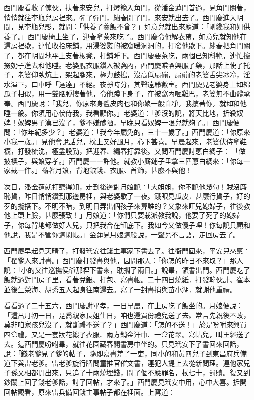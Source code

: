 西門慶看收了傢伙，扶著來安兒，打燈籠入角門，從潘金蓮門首過，見角門關著，悄悄就往李瓶兒房裡來。彈了彈門，繡春開了門，來安就出去了。西門慶進入明間，見李瓶兒影，就問：「供養了羹飯不曾？」如意兒就出來應道：「剛纔我和姐供養了。」西門慶椅上坐了，迎春拿茶來吃了。西門慶令他解衣帶，如意兒就知他在這房裡歇，連忙收拾床鋪，用湯婆熨的被窩暖洞洞的，打發他歇下。繡春把角門關了，都在明間地平上支著板凳，打鋪睡下。西門慶要茶吃，兩個已知科範，連忙攛掇奶子進去和他睡。老婆脫衣服鑽入被窩內，西門慶乘酒興服了藥，那話上使了托子，老婆仰臥炕上，架起腿來，極力鼓搗，沒高低扇磞，扇磞的老婆舌尖冰冷，淫水溢下，口中呼「達達」不絕。夜靜時分，其聲遠聆數室。西門慶見老婆身上如綿瓜子相似，用一雙胳膊摟著他，令他蹲下身子，在被窩內咂雞巴，老婆無不曲體承奉。西門慶說：「我兒，你原來身體皮肉也和你娘一般白凈，我摟著你，就如和他睡一般。你須用心伏侍我，我看顧你。」老婆道：「爹沒的說，將天比地，折殺奴婢！奴婢男子漢已沒了，爹不嫌醜陋，早晚只看奴婢一眼兒就夠了。」西門慶便問：「你年紀多少？」老婆道：「我今年屬免的，三十一歲了。」西門慶道：「你原來小我一歲。」見他會說話兒，枕上又好風月，心下甚喜。早晨起來，老婆伏侍拿鞋襪，打發梳洗，極盡殷勤，把迎春、繡春打靠後。又問西門慶討蔥白綢子： 「做披襖子，與娘穿孝。」西門慶一一許他。就教小廝鋪子里拿三匹蔥白綢來：「你每一家裁一件。」瞞著月娘，背地銀錢、衣服、首飾，甚麼不與他！

次日，潘金蓮就打聽得知，走到後邊對月娘說：「大姐姐，你不說他幾句！賊沒廉恥貨，昨日悄悄鑽到那邊房裡，與老婆歇了一夜。餓眼見瓜皮，甚麼行貨子，好的歹的攬搭下。不明不暗，到明日弄出個孩子來算誰的？又象來旺兒媳婦子，往後教他上頭上臉，甚麼張致！」月娘道：「你們只要栽派教我說，他要了死了的媳婦子，你每背地都做好人兒，只把我合在缸底下。我如今又做傻子哩！你每說只顧和他說，我是不管你這閑帳。」金蓮見月娘這般說，一聲兒不言語，走回房去了。

西門慶早起見天晴了，打發玳安往錢主事家下書去了。往衙門回來，平安兒來稟：「翟爹人來討書。」西門慶打發書與他，因問那人：「你怎的昨日不來取？」那人說：「小的又往巡撫侯爺那裡下書來，耽擱了兩日。」說畢，領書出門。西門慶吃了飯就過對門房子里，看著兌銀、打包、寫書帳。二十四日燒紙，打發韓伙計、崔本並後生榮海、胡秀五人起身往南邊去。寫了一封書捎與苗小湖，就謝他重禮。

看看過了二十五六，西門慶謝畢孝，一日早晨，在上房吃了飯坐的。月娘便說：「這出月初一日，是喬親家長姐生日，咱也還買份禮兒送了去。常言先親後不改，莫非咱家孩兒沒了，就斷禮不送了？」西門慶道：「怎的不送！」於是吩咐來興買四盒禮，又是一套妝花緞子衣服、兩方銷金汗巾、一盒花翠。寫帖兒，叫王經送了去。這西門慶吩咐畢，就往花園藏春閣書房中坐的。只見玳安下了書回來回話，說：「錢老爹見了爹的帖子，隨即寫書差了一吏，同小的和黃四兒子到東昌府兵備道下與雷老爹。雷老爹旋行牌問童推官催文書，連犯人提上去從新問理。連他家兒子孫文相都開出來，只追了十兩燒埋錢，問了個不應罪名，杖七十，罰贖。復又到鈔關上回了錢老爹話，討了回帖，才來了。」西門慶見玳安中用，心中大喜。拆開回帖觀看，原來雷兵備回錢主事帖子都在裡面。上寫道：

